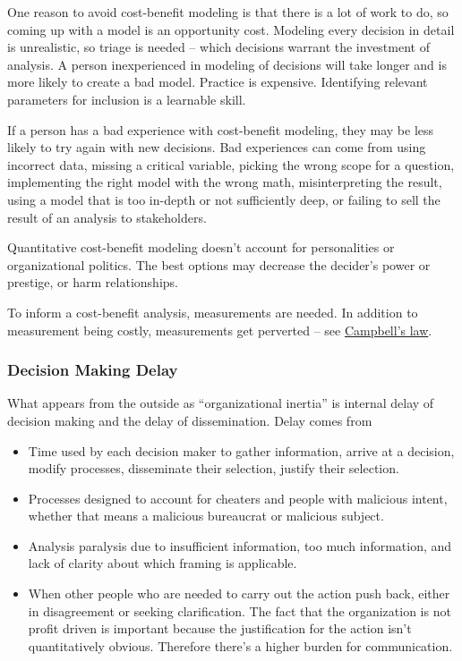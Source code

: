 One reason to avoid cost-benefit modeling is that there is a lot of work to do, so coming up with a model is an opportunity cost. Modeling every decision in detail is unrealistic, so triage is needed -- which decisions warrant the investment of analysis. A person inexperienced in modeling of decisions will take longer and is more likely to create a bad model. Practice is expensive. Identifying relevant parameters for inclusion is a learnable skill. 

If a person has a bad experience with cost-benefit modeling, they may be less likely to try again with new decisions. Bad experiences can come from using incorrect data, missing a critical variable, picking the wrong scope for a question, implementing the right model with the wrong math, misinterpreting the result, using a model that is too in-depth or not sufficiently deep, or failing to sell the result of an analysis to stakeholders.

Quantitative cost-benefit modeling doesn't account for personalities or organizational politics. The best options may decrease the decider's power or prestige, or harm relationships. 

To inform a cost-benefit analysis, measurements are needed. In addition to measurement being costly, measurements get perverted -- see \href{https://en.wikipedia.org/wiki/Campbell\%27s_law}{Campbell's law}. 

\subsubsection{Decision Making Delay\label{sec:decision-delay}}

What appears from the outside as ``organizational inertia'' is internal delay of decision making and the delay of dissemination. 
Delay comes from
\begin{itemize}
    \item Time used by each decision maker to gather information, arrive at a decision, modify processes, disseminate their selection, justify their selection. 
    \item Processes designed to account for cheaters and people with malicious intent, whether that means a malicious bureaucrat or malicious subject. 
\item Analysis paralysis due to insufficient information, too much information, and lack of clarity about which framing is applicable.
\item When other people who are needed to carry out the action push back, either in disagreement or seeking clarification. The fact that the organization is not profit driven is important because the justification for the action isn't quantitatively obvious. Therefore there's a higher burden for communication.
\end{itemize}


